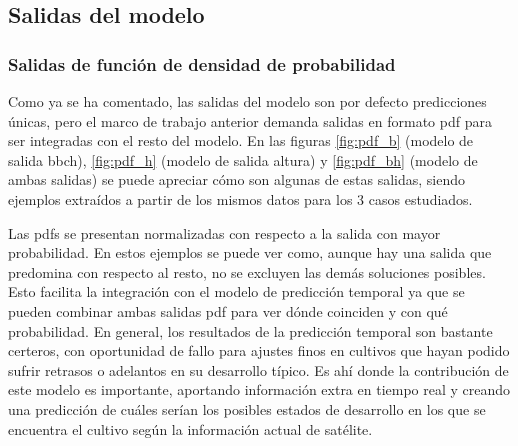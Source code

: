 \subsection{Salidas del modelo}
\subsubsection{Salidas de función de densidad de probabilidad}
Como ya se ha comentado, las salidas del modelo son por defecto predicciones únicas, pero el marco de trabajo anterior demanda salidas en formato \gls{pdf} para ser integradas con el resto del modelo. En las figuras \ref{fig:pdf_b} (modelo de salida \gls{bbch}), \ref{fig:pdf_h} (modelo de salida altura) y \ref{fig:pdf_bh} (modelo de ambas salidas) se puede apreciar cómo son algunas de estas salidas, siendo ejemplos extraídos a partir de los mismos datos para los 3 casos estudiados. 
\\
\par Las \gls{pdf}s se presentan normalizadas con respecto a la salida con mayor probabilidad. En estos ejemplos se puede ver como, aunque hay una salida que predomina con respecto al resto, no se excluyen las demás soluciones posibles. Esto facilita la integración con el modelo de predicción temporal ya que se pueden combinar ambas salidas \gls{pdf} para ver dónde coinciden y con qué probabilidad. En general, los resultados de la predicción temporal son bastante certeros, con oportunidad de fallo para ajustes finos en cultivos que hayan podido sufrir retrasos o adelantos en su desarrollo típico. Es ahí donde la contribución de este modelo es importante, aportando información extra en tiempo real y creando una predicción de cuáles serían los posibles estados de desarrollo en los que se encuentra el cultivo según la información actual de satélite. 
\\
